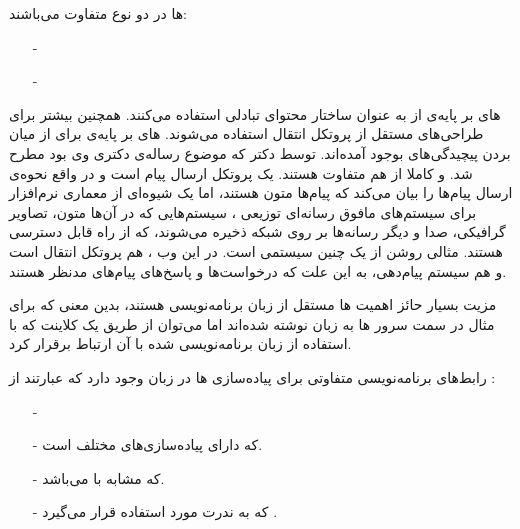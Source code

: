 \documentclass[oneside]{report}
\begin{document}
{\normalsize{}}ها 
در دو نوع متفاوت می‌باشند: 
\begin{itemize}
	\item[-] {\normalsize{}}
	\item[-]{\normalsize{}}
\end{itemize}
{\normalsize{}} های 
بر پایه‌ی 
{\normalsize{}}
از 
{\normalsize{}}
به عنوان ساختار محتوای تبادلی استفاده می‌کنند.  همچنین بیشتر برای طراحی‌های مستقل از پروتکل انتقال استفاده‌ می‌شوند. 
{\normalsize{}} های 
بر پایه‌ی 
{\normalsize{}}
برای از میان بردن پیچیدگی‌های 
{\normalsize{}}
بوجود آمده‌اند.
{\normalsize{}}
توسط دکتر 
{\normalsize{}}
که موضوع رساله‌ی دکتری وی بود مطرح شد. 
{\normalsize{}}
و 
{\normalsize{}}
کاملا از هم متفاوت هستند. 
{\normalsize{}}
یک پروتکل ارسال پیام است و در واقع نحوه‌ی ارسال پیام‌‌ها را بیان می‌کند که پیام‌ها متون 
{\normalsize{}}
هستند، اما 
{\normalsize{}}
یک شیوه‌ای از معماری نرم‌افزار برای سیستم‌های مافوق رسانه‌ای توزیعی 
    	،  سیستم‌هایی که در آن‌ها متون،  تصاویر گرافیکی، صدا و دیگر رسانه‌ها بر روی شبکه ذخیره می‌شوند، که از راه 
{\normalsize{}}
قابل دسترسی هستند. 
{\normalsize{}}
مثالی روشن از یک چنین سیستمی است. در این وب ، 
{\normalsize{}}
هم پروتکل انتقال است و هم سیستم پیام‌دهی، به این علت که درخواست‌ها 
و پاسخ‌های 
پیام‌های مدنظر هستند.

مزیت بسیار حائز اهمیت 
{\normalsize{}} ها 
مستقل از زبان برنامه‌نویسی
 هستند، بدین معنی که برای مثال در سمت سرور 
{\normalsize{}} ها 
به زبان 
{\normalsize{}}
نوشته‌‌ شده‌اند اما می‌توان از طریق یک کلاینت که با استفاده از زبان 
{\normalsize{}}
برنامه‌نویسی شده با آن ارتباط برقرار کرد. 

رابط‌های برنامه‌نویسی متفاوتی برای پیاده‌سازی 
{\normalsize{}} ها 
در زبان 
{\normalsize{}}
وجود دارد که عبارتند از : 

\begin{itemize}
	\item [-]{\normalsize{}}
	\item [-]{\normalsize{}}
	که دارای پیاده‌سازی‌های مختلف است.
	\item [-]{\normalsize{}}
	که مشابه با 
	{\normalsize{}}
	می‌باشد.
	\item [-]{\normalsize{}} 
	که به ندرت مورد استفاده قرار می‌گیرد
	\cite{webserviceoreilly}.
\end{itemize}
\end{document}
